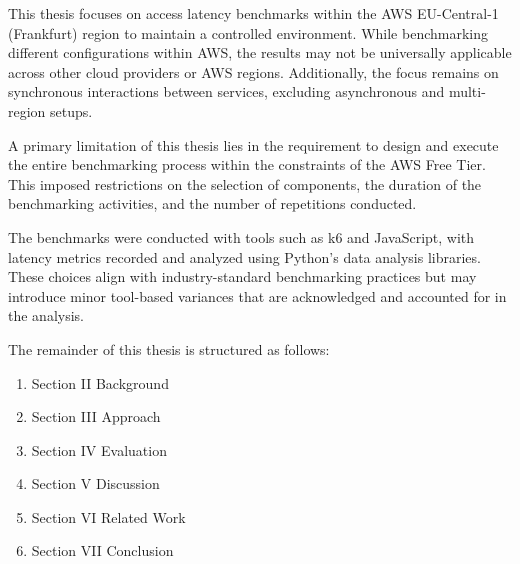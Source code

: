 This thesis focuses on access latency benchmarks within the AWS EU-Central-1 (Frankfurt) region to maintain a controlled environment. While benchmarking different configurations within AWS, the results may not be universally applicable across other cloud providers or AWS regions. Additionally, the focus remains on synchronous interactions between services, excluding asynchronous and multi-region setups.

A primary limitation of this thesis lies in the requirement to design and execute the entire benchmarking process within the constraints of the AWS Free Tier. This imposed restrictions on the selection of components, the duration of the benchmarking activities, and the number of repetitions conducted.

The benchmarks were conducted with tools such as k6 and JavaScript, with latency metrics recorded and analyzed using Python’s data analysis libraries. These choices align with industry-standard benchmarking practices but may introduce minor tool-based variances that are acknowledged and accounted for in the analysis.

The remainder of this thesis is structured as follows:
\begin{enumerate}
	\item Section II Background
	\item Section III Approach
	\item Section IV Evaluation
	\item Section V Discussion
	\item Section VI Related Work
	\item Section VII Conclusion
\end{enumerate}